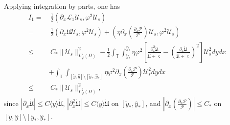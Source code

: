 \documentclass{amsart}
\numberwithin{equation}{section}
\newcommand\y{{{\langle y \rangle}}}
\begin{document}
Applying integration by parts, one has
\begin{align*}
I_{1}
=&~\frac{1}{2}(\partial_{x}\mathcal{L}_{1}\mathcal{U}_{s},\varphi^{2}\mathcal{U}_{s})\\
=&~\frac{1}{2}(\partial_{x}\mathfrak{U}\mathcal{U}_{s},\varphi^{2}\mathcal{U}_{s})
  +\left(\eta\partial_{x}\left(\frac{\partial_{x}\mathcal{P}}{\mathcal{P}}\right)\mathcal{U}_{s},\varphi^{2}\mathcal{U}_{s}\right)\\
\leq&~C_{*}\|\mathcal{U}_{s}\|_{L_{\varphi}^{2}(\Omega)}^{2}
    -\frac{1}{2}\int_{\mathbb{T}}\int_{\check{y}_{*}}^{\hat{y}_{*}}\eta\varphi^{2}\left[\frac{\partial_{x}^{2}\dot{\mathfrak{U}}}{\dot{\mathfrak{U}}+\varsigma}-\left(\frac{\partial_{x}\dot{\mathfrak{U}}}{\dot{\mathfrak{U}}+\varsigma}\right)^{2}\right]\mathcal{U}_{s}^{2}dydx\nonumber\\
   &+\int_{\mathbb{T}}\int_{[\check{y},\hat{y}]\setminus[\check{y}_{*},\hat{y}_{*}]}\eta\varphi^{2}\partial_{x}\left(\frac{\partial_{x}\mathcal{P}}{\mathcal{P}}\right)\mathcal{U}_{s}^{2}dydx\nonumber\\
\leq&~C_{*}\|\mathcal{U}_{s}\|_{L_{\varphi}^{2}(\Omega)}^{2},\nonumber
\end{align*}
since $|\partial_{x}\dot{\mathfrak{U}}|\leq C\y\dot{\mathfrak{U}}$, $|\partial_{x}^{2}\dot{\mathfrak{U}}|\leq C\y\dot{\mathfrak{U}}$ on $[\check{y}_{*},\hat{y}_{*}]$, and $\left|\partial_{x}\left(\frac{\partial_{x}\mathcal{P}}{\mathcal{P}}\right)\right|\leq C_{*}$ on $[\check{y},\hat{y}]\setminus[\check{y}_{*},\hat{y}_{*}]$.
\end{document}
